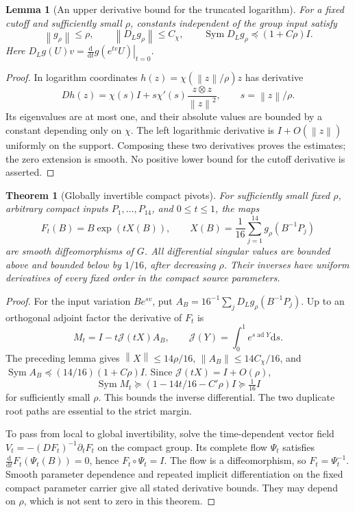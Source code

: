 \documentclass[11pt,oneside,openany]{book}
\newtheorem{theorem}{Theorem}[chapter]
\newtheorem{lemma}[lemma]{Lemma}
\theoremstyle{definition}
\theoremstyle{remark}
\newcommand{\dd}{\mathrm d}
\newcommand{\norm}[1]{\left\lVert#1\right\rVert}
\begin{document}
\begin{lemma}[An upper derivative bound for the truncated logarithm]
\label{lem:pivot-cutoff}
For a fixed cutoff and sufficiently small $\rho$, constants independent
of the group input satisfy
\[
 \norm{g_\rho}\le\rho,\qquad
 \norm{D_Lg_\rho}\le C_\chi,\qquad
 \operatorname{Sym}D_Lg_\rho\preceq(1+C\rho)I.
\]
Here $D_Lg(U)v=\left.\frac{\dd}{\dd t}g(e^{tv}U)\right|_{t=0}$.
\end{lemma}
\begin{proof}
In logarithm coordinates $h(z)=\chi(\norm z/\rho)z$ has derivative
\[
 Dh(z)=\chi(s)I+s\chi'(s)\frac{z\otimes z}{\norm z^2},
 \qquad s=\norm z/\rho.
\]
Its eigenvalues are at most one, and their absolute values are bounded
by a constant depending only on $\chi$. The left logarithmic derivative
is $I+O(\norm z)$ uniformly on the support. Composing these two
derivatives proves the estimates; the zero extension is smooth.
No positive lower bound for the cutoff derivative is asserted.
\end{proof}

\begin{theorem}[Globally invertible compact pivots]
\label{thm:global-pivot}
For sufficiently small fixed $\rho$, arbitrary compact inputs
$P_1,\ldots,P_{14}$, and $0\le t\le1$, the maps
\[
 F_t(B)=B\exp(tX(B)),\qquad
 X(B)=\frac1{16}\sum_{j=1}^{14}g_\rho(B^{-1}P_j)
\]
are smooth diffeomorphisms of $G$. All differential singular values are
bounded above and bounded below by $1/16$, after decreasing $\rho$.
Their inverses have uniform derivatives of every fixed order in the
compact source parameters.
\end{theorem}
\begin{proof}
For the input variation $Be^{sv}$, put
$A_B=16^{-1}\sum_jD_Lg_\rho(B^{-1}P_j)$. Up to an orthogonal adjoint
factor the derivative of $F_t$ is
\[
 M_t=I-t\mathcal J(tX)A_B,\qquad
 \mathcal J(Y)=\int_0^1e^{s\operatorname{ad}Y}\dd s.
\]
The preceding lemma gives $\norm X\le14\rho/16$,
$\norm{A_B}\le14C_\chi/16$, and
$\operatorname{Sym}A_B\preceq(14/16)(1+C\rho)I$.
Since $\mathcal J(tX)=I+O(\rho)$,
\[
 \operatorname{Sym}M_t\succeq(1-14t/16-C'\rho)I
                         \succeq\tfrac1{16}I
\]
for sufficiently small $\rho$. This bounds the inverse differential.
The two duplicate root paths are essential to the strict margin.

To pass from local to global invertibility, solve the time-dependent
vector field $V_t=-(DF_t)^{-1}\partial_tF_t$ on the compact group.
Its complete flow $\Psi_t$ satisfies
$\frac{\dd}{\dd t}F_t(\Psi_t(B))=0$, hence
$F_t\circ\Psi_t=I$. The flow is a diffeomorphism, so $F_t=\Psi_t^{-1}$.
Smooth parameter dependence and repeated implicit differentiation on
the fixed compact parameter carrier give all stated derivative bounds.
They may depend on $\rho$, which is not sent to zero in this theorem.
\end{proof}
\end{document}
